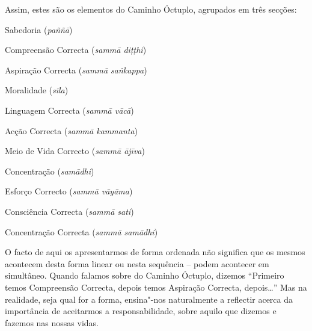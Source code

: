 Assim, estes são os elementos do Caminho Óctuplo, agrupados em três secções:

\clearpage

\bigskip

\noindent
Sabedoria (\emph{paññā})

\bigskip

\begin{packedenumerate}

\item Compreensão Correcta (\emph{sammā diṭṭhi})
\item Aspiração Correcta (\emph{sammā saṅkappa})

\end{packedenumerate}

\bigskip

\noindent
Moralidade (\emph{sīla})

\bigskip

\begin{packedenumerate}
\setcounter{enumi}{2}

\item Linguagem Correcta (\emph{sammā vācā})
\item Acção Correcta (\emph{sammā kammanta})
\item Meio de Vida Correcto (\emph{sammā ājīva})

\end{packedenumerate}

\bigskip

\noindent
Concentração (\emph{samādhi})

\bigskip

\begin{packedenumerate}
\setcounter{enumi}{5}

\item Esforço Correcto (\emph{sammā vāyāma})
\item Consciência Correcta (\emph{sammā sati})
\item Concentração Correcta (\emph{sammā samādhi})

\end{packedenumerate}

\bigskip

O facto de aqui os apresentarmos de forma ordenada não significa que os mesmos
acontecem desta forma linear ou nesta sequência – podem acontecer em simultâneo.
Quando falamos sobre do Caminho Óctuplo, dizemos “Primeiro temos Compreensão
Correcta, depois temos Aspiração Correcta, depois\ldots{}” Mas na realidade, seja
qual for a forma, ensina"-nos naturalmente a reflectir acerca da importância de
aceitarmos a responsabilidade, sobre aquilo que dizemos e fazemos nas nossas
vidas.

